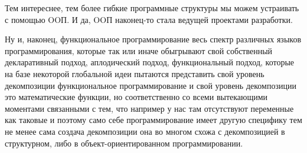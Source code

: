 Тем интереснее, тем более гибкие программные структуры мы можем устраивать с помощью OOП. И да, OOП наконец-то стала ведущей проектами разработки.

Ну и, наконец, функциональное программирование весь спектр различных языков программирования, которые так или иначе обыгрывают свой собственный декларативный подход, аплодический подход, функциональный подход, которые на базе некоторой глобальной идеи пытаются представить свой уровень декомпозиции функциональное программирование и свой уровень декомпозиции это математические функции, но соответственно со всеми вытекающими моментами связанными с тем, что например у нас там отсутствуют переменные как таковые и поэтому само себе программирование имеет другую специфику тем не менее сама создача декомпозиции она во многом схожа с декомпозицией в структурном, либо в объект-ориентированном программировании.
